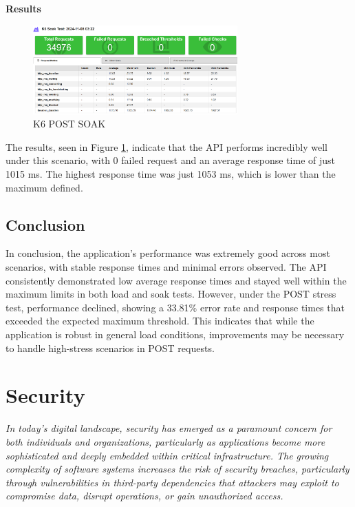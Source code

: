 \documentclass[a4paper,11pt,openright,BCOR=15mm]{scrbook}
\begin{document}
		\textbf{Results}
		\begin{figure}[H]
			\centering
			\includegraphics[width=0.7\textwidth]{figs/Performance/Results/K6 POST SOAK.png}
			\caption{K6 POST SOAK}
			\label{fig:K6-POST-SOAK}
		\end{figure}
		The results, seen in Figure \ref{fig:K6-POST-SOAK}, indicate that the API performs incredibly well under this scenario, with 0 failed request and an average response time of just 1015 ms. The highest response time was just 1053 ms, which is lower than the maximum defined.


		\section{Conclusion}

In conclusion, the application's performance was extremely good across most scenarios, with stable response times and minimal errors observed. The API consistently demonstrated low average response times and stayed well within the maximum limits in both load and soak tests. However, under the POST stress test, performance declined, showing a 33.81\% error rate and response times that exceeded the expected maximum threshold. This indicates that while the application is robust in general load conditions, improvements may be necessary to handle high-stress scenarios in POST requests.
	\chapter{Security}
\textit{	In today's digital landscape, security has emerged as a paramount concern for both individuals and organizations, particularly as applications become more sophisticated and deeply embedded within critical infrastructure. The growing complexity of software systems increases the risk of security breaches, particularly through vulnerabilities in third-party dependencies that attackers may exploit to compromise data, disrupt operations, or gain unauthorized access.}
\end{document}

